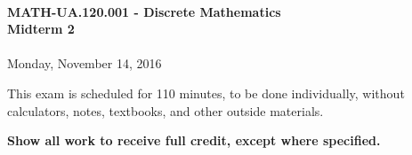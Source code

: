 \documentclass[12pt]{article}
\begin{document}
\thispagestyle{firststyle}
~
\vspace{0.5cm}

\begin{center}
\textbf{\Large MATH-UA.120.001 - Discrete Mathematics \\ \vspace{0.5cm} Midterm 2}\\~\\
Monday, November 14, 2016
\end{center}

\vspace{1cm}


\vspace{1cm}

\noindent
This exam is scheduled for 110 minutes, to be done individually, without calculators, notes, textbooks, and other outside materials.
\vspace{0.5cm}

\noindent
\textbf{Show all work to receive full credit, except where specified.}

\vspace{1cm}
\end{document}
